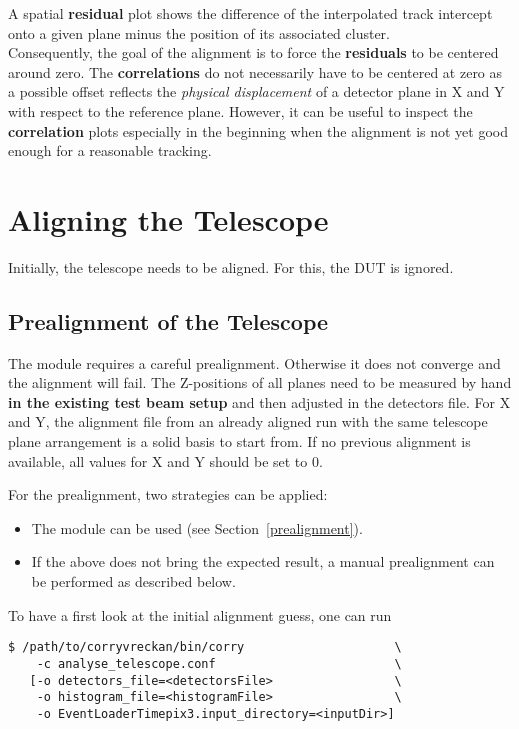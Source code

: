 A spatial \textbf{residual} plot shows the difference of the interpolated track intercept onto a given plane minus the position of its associated cluster.\\

Consequently, the goal of the alignment is to force the \textbf{residuals} to be centered around zero.
The \textbf{correlations} do not necessarily have to be centered at zero as a possible offset reflects the \emph{physical displacement} of a detector plane in X and Y with respect to the reference plane.
However, it can be useful to inspect the \textbf{correlation} plots especially in the beginning when the alignment is not yet good enough for a reasonable tracking.

\section{Aligning the Telescope}
\label{sec:align_tel}
Initially, the telescope needs to be aligned.
For this, the DUT is ignored.

\subsection*{Prealignment of the Telescope}
The  module requires a careful prealignment. Otherwise it does not converge and the alignment will fail.
The Z-positions of all planes need to be measured by hand \textbf{in the existing test beam setup} and then adjusted in the detectors file.
For X and Y, the alignment file from an already aligned run with the same telescope plane arrangement is a solid basis to start from.
If no previous alignment is available, all values for X and Y should be set to 0.

For the prealignment, two strategies can be applied:
\begin{itemize}
\item The  module can be used (see Section~\ref{prealignment}).
\item If the above does not bring the expected result, a manual prealignment can be performed as described below.
\end{itemize}

To have a first look at the initial alignment guess, one can run
\begin{verbatim}
$ /path/to/corryvreckan/bin/corry                     \
    -c analyse_telescope.conf                         \
   [-o detectors_file=<detectorsFile>                 \
    -o histogram_file=<histogramFile>                 \
    -o EventLoaderTimepix3.input_directory=<inputDir>]
\end{verbatim}

